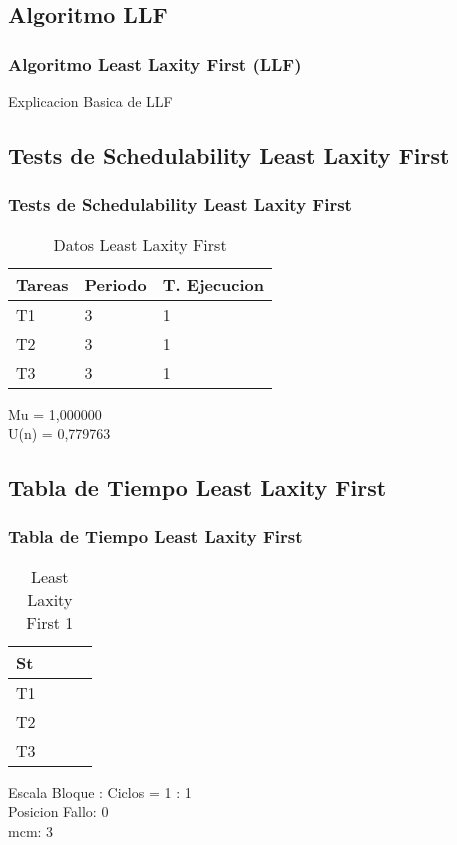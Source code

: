 \documentclass[xcolor=table]{beamer}
\begin{document}
\subsection{Algoritmo LLF}

\begin{frame} 
\frametitle{Algoritmo Least Laxity First (LLF)} 
Explicacion Basica de LLF \\
\end{frame}

\subsection{Tests de Schedulability  Least Laxity First } 

\begin{frame} 
\frametitle{Tests de Schedulability  Least Laxity First } 
\begin{table} 
\centering 
\begin{tabular}{|l|l|l|} 
\hline 
Tareas & Periodo & T. Ejecucion \\ \hline 
T1   & 3  &  1\\ \hline 
T2   & 3  &  1\\ \hline 
T3   & 3  &  1\\ \hline 
\end{tabular} 
\caption{Datos  Least Laxity First } 
\end{table} 
Mu =  1,000000 \\ 
U(n) =  0,779763 \\ 
\end{frame} 

\subsection{Tabla de Tiempo  Least Laxity First } 

\begin{frame} 
\frametitle{Tabla de Tiempo  Least Laxity First } 
\begin{table} 
\centering 
\begin{tabular}{|l|l|l|l|} 
\hline 
St & \cellcolor{green} & \cellcolor{green} & \cellcolor{green} \\ \hline 
T1 & & & \cellcolor{blue} \\ \hline 
T2 & & \cellcolor{purple} & \\ \hline 
T3 & \cellcolor{cyan} & & \\ \hline 
\end{tabular} 
\caption{ Least Laxity First 1 } 
\end{table} 
Escala Bloque : Ciclos = 1 : 1 \\ 
Posicion Fallo:  0 \\ 
mcm:  3 \\ 
\end{frame} 

\end{document}
